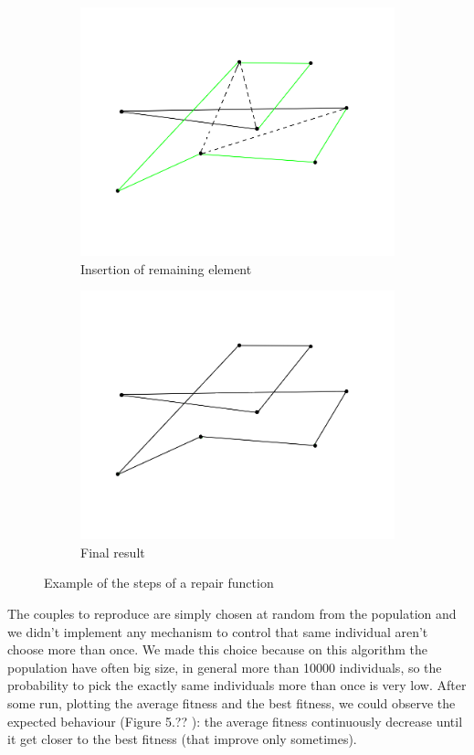 \begin{figure}[h!]
\begin{subfigure}[b]{0.45\linewidth}
    \includegraphics[width=\linewidth]{media/correction3.png}
    \caption{Insertion of remaining element}
  \end{subfigure}
  \begin{subfigure}[b]{0.45\linewidth}
    \includegraphics[width=\linewidth]{media/correction4.png}
    \caption{Final result}
  \end{subfigure}
  \caption{Example of the steps of a repair function}
\end{figure}

The couples to reproduce are simply chosen at random from the population and we didn't implement any mechanism to control that same individual aren't choose more than once. We made this choice because on this algorithm the population have often big size, in general more than 10000 individuals, so the probability to pick the exactly same individuals more than once is very low.
After some run, plotting the average fitness and the best fitness, we could observe the 
expected behaviour (Figure 5.?? %
 ): the average fitness continuously decrease until it get closer to the best fitness (that improve only sometimes).  \\

